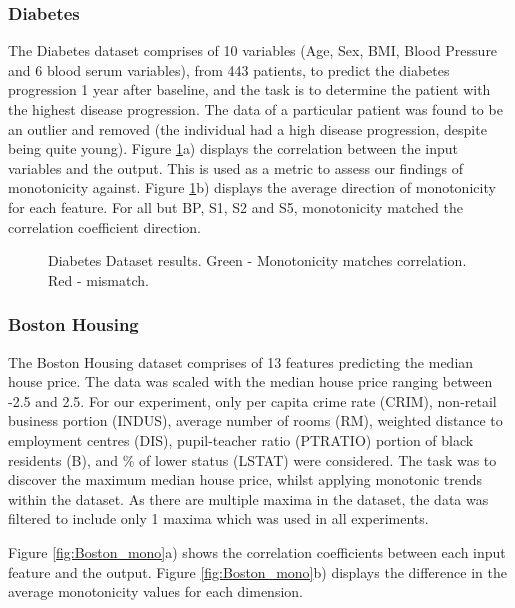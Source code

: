 \subsubsection{Diabetes}
The Diabetes dataset comprises of 10 variables (Age, Sex, BMI, Blood Pressure and 6 blood serum variables), from 443 patients, to predict the diabetes progression 1 year after baseline, and the task is to determine the patient with the highest disease progression.  The data of a particular patient was found to be an outlier and removed (the individual had a high disease progression, despite being quite young). Figure \ref{fig:Diabetes_mono}a) displays the correlation between the input variables and the output. This is used as a metric to assess our findings of monotonicity against. Figure \ref{fig:Diabetes_mono}b) displays the average direction of monotonicity for each feature.  For all but BP, S1, S2 and S5, monotonicity matched the correlation coefficient direction.

\begin{figure}
	\centering
	\qquad
	\caption{Diabetes Dataset results. Green - Monotonicity matches correlation. Red - mismatch.}%
	\label{fig:Diabetes_mono}%
\end{figure}

\subsubsection{Boston Housing}
The Boston Housing dataset comprises of 13 features predicting the  median house price. The data was scaled with the median house price ranging between -2.5 and 2.5. For our experiment, only per capita crime rate (CRIM), non-retail business portion (INDUS), average number of rooms (RM), weighted distance to employment centres (DIS), pupil-teacher ratio (PTRATIO) portion of black residents (B), and \% of lower status (LSTAT)  were considered. The task was to discover the maximum median house price, whilst applying monotonic trends within the dataset. As there are multiple maxima in the dataset, the data was filtered to include only 1 maxima which was used in all experiments.

Figure \ref{fig:Boston_mono}a) shows the correlation coefficients between each input feature and the output. Figure \ref{fig:Boston_mono}b) displays the difference in the average monotonicity values for each dimension.

